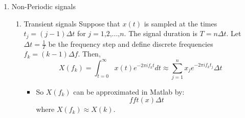 \documentclass{amsart}
\theoremstyle{definition}
\newcommand\equalhat{\mathrel{\stackon[1.5pt]{=}{\stretchto{%
    \scalerel*[\widthof{=}]{\wedge}{\rule{1ex}{3ex}}}{0.5ex}}}}
\begin{document}
\begin{enumerate}
\begin{enumerate}
\begin{enumerate}
 \item Discrete Fourier Transform (DFT):\\
If $x(t)$ is sampled with a time step $\Delta t$ at times $t_j = (j-1) \Delta t$ for $j = 1 \textit{,} 2 \textit{,...,} n$ where $\Delta t = \frac{T}{n}$ and $x_j = x(t_j)$, then $X_k$ is approximated by a discrete Fourier transform:
\begin{align*}
\qquad\qquad\qquad X_k &\approx \frac{1}{n} \sum_{j=1}^{n} x_je^{\frac{-2 \pi ik(j-1)}{n}}  \qquad\text{:}\qquad \textit{DFT, two-sided}\\
\Delta t &= \frac{T}{n} = \frac{1}{f_s} \text{,}\qquad f_s \text{: sampling frequency (in 1 second)} \text{,}\qquad n \text{: \# samples (in 1 period)} \text{,}\qquad j-1 \text{: sample}\\
\frac{k}{n} &\equalhat f \qquad\text{,}\qquad j-1 \equalhat t %
\end{align*}
\begin{itemize} 
\item Fourier transform function in Matlab:
\[fft(x)/n\]
where $n = length(x)$, $X(k) \approx X_{k-1}$, and the fft returns two-sided Fourier coefficients.\\
\end{itemize}
\bigskip

If x(t) is a periodic signal then it only has power at discrete frequencies, those that are integer multiples of its base frequency. 
\end{enumerate}
\item Non-Periodic signals\\
\begin{enumerate}
\item Transient signals
Suppose that $x(t)$ is sampled at the times $t_j = (j-1) \Delta t$ for $j = 1 \textit{,} 2 \textit{,...,} n$. The signal duration is $T = n \Delta t$.  Let $\Delta t = \frac{1}{T}$ be the frequency step and define discrete frequencies $f_k = (k-1) \Delta f$.  Then,
\[X(f_k) = \int_{t=0}^{\infty} x(t)e^{-2 \pi i f_k t} dt \approx \sum_{j=1}^n x_j e^{-2 \pi i f_k t_j} \Delta t \]
\begin{itemize} 
\item So $X(f_k)$ can be approximated in Matlab by:
\[fft(x) \Delta t\]
where $X(f_k) \approx X(k)$.\\
\end{itemize}
\end{enumerate}


\end{enumerate}
\end{enumerate}
\end{document}
